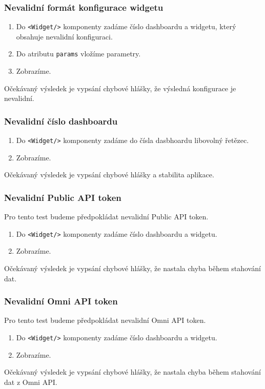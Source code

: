 \documentclass[czech, bc, kiv, he, iso690numb]{fasthesis}
\begin{document}
\subsubsection{Nevalidní formát konfigurace widgetu}
\begin{enumerate}
	\item Do \texttt{<Widget/>} komponenty zadáme číslo dashboardu a widgetu, který obsahuje nevalidní konfiguraci.
	\item Do atributu \texttt{params} vložíme parametry.
	\item Zobrazíme.
\end{enumerate}

Očekávaný výsledek je vypsání chybové hlášky, že výsledná konfigurace je nevalidní.

\subsubsection{Nevalidní číslo dashboardu}
\begin{enumerate}
	\item Do \texttt{<Widget/>} komponenty zadáme do čísla dasbhoardu libovolný řetězec.
	\item Zobrazíme.
\end{enumerate}
Očekávaný výsledek je vypsání chybové hlášky a stabilita aplikace.

\subsubsection{Nevalidní Public API token}
Pro tento test budeme předpokládat nevalidní Public API token.
\begin{enumerate}
	\item Do \texttt{<Widget/>} komponenty zadáme číslo dashboardu a widgetu.
	\item Zobrazíme.
\end{enumerate}
Očekávaný výsledek je vypsání chybové hlášky, že nastala chyba během stahování dat.

\subsubsection{Nevalidní Omni API token}
Pro tento test budeme předpokládat nevalidní Omni API token.
\begin{enumerate}
	\item Do \texttt{<Widget/>} komponenty zadáme číslo dashboardu a widgetu.
	\item Zobrazíme.
\end{enumerate}
Očekávaný výsledek je vypsání chybové hlášky, že nastala chyba během stahování dat z Omni API.
\end{document}
